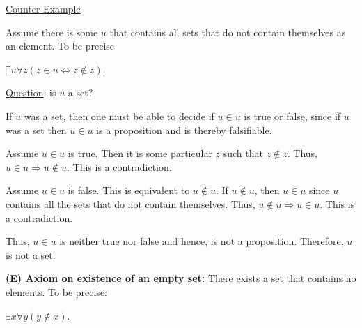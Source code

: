 \documentclass[12pt, a4paper]{article}
\begin{document}
\begin{flushleft}

\underline{Counter Example}

\vspace{4mm}

Assume there is some $u$ that contains all sets that do not contain themselves as an element. To be precise\par

\vspace{4mm}

\centerline{$\exists u\forall z(z\in u\Leftrightarrow z\notin z)$.}

\vspace{4mm}

\underline{Question}: is $u$ a set?\par

\vspace{4mm}

If $u$ was a set, then one must be able to decide if $u\in u$ is true or false, since if $u$ was a set then $u\in u$ is a proposition and is thereby falsifiable.\par

\vspace{4mm}

Assume $u\in u$ is true. Then it is some particular $z$ such that $z\notin z$. Thus, $u\in u\Rightarrow u\notin u$. This is a contradiction.\par

\vspace{4mm}

Assume $u\in u$ is false. This is equivalent to $u\notin u$. If $u\notin u$, then $u\in u$ since $u$ contains all the sets that do not contain themselves. Thus, $u\notin u\Rightarrow u\in u$. This is a contradiction.\par

\vspace{4mm}

Thus, $u\in u$ is neither true nor false and hence, is not a proposition. Therefore, $u$ is not a set.\par

\end{flushleft}

\textbf{(E) Axiom on existence of an empty set: }There exists a set that contains no elements. To be precise:\par

\vspace{4mm}

\centerline{$\exists x\forall y(y\notin x)$.}
\end{document}

